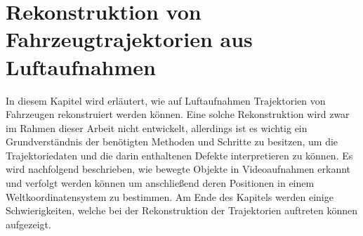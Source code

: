 


\chapter{Rekonstruktion von Fahrzeugtrajektorien aus Luftaufnahmen}
\label{sec:position_extraction}




In diesem Kapitel wird erläutert, wie auf Luftaufnahmen Trajektorien von Fahrzeugen rekonstruiert werden können.
Eine solche Rekonstruktion wird zwar im Rahmen dieser Arbeit nicht entwickelt, allerdings ist es wichtig ein Grundverständnis
der benötigten Methoden und Schritte zu besitzen, um die Trajektoriedaten und die darin enthaltenen Defekte
interpretieren zu können.
Es wird nachfolgend beschrieben, wie bewegte Objekte in Videoaufnahmen erkannt und verfolgt
werden können um anschließend deren Positionen in einem Weltkoordinatensystem zu bestimmen. Am Ende des Kapitels
werden einige Schwierigkeiten, welche bei der Rekonstruktion der Trajektorien auftreten können aufgezeigt.

